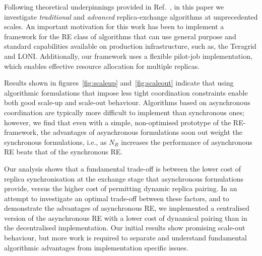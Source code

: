 \documentclass{rspublic}
\newcommand{\alnote}[1]{ {\textcolor{blue} { ***andre: #1 }}}
\newcommand{\athotanote}[1]{ {\textcolor{green} { ***athota: #1 }}}
\newcommand{\alnote}[1]{}
\newcommand{\athotanote}[1]{}
\begin{document}
Following theoretical underpinnings provided in
Ref.~\citep{parashar_arepex,DBLP:journals/jcc/GallicchioLP08}, in this
paper we investigate {\it traditional} and {\it advanced}
replica-exchange algorithms at unprecedented scales.  An important
motivation for this work has been to implement a framework for the RE
class of algorithms that can use general purpose and standard
capabilities available on production infrastructure, such as, the
Teragrid and LONI.  Additionally, our framework uses a flexible
pilot-job implementation, which enables effective resource allocation
for multiple replicas.

Results shown in figures~\ref{fig:scaleup} and~\ref{fig:scaleout}
indicate that using algorithmic formulations that impose less tight
coordination constraints enable both good scale-up and scale-out
behaviour.  Algorithms based on asynchronous coordination are
typically more difficult to implement than synchronous ones; however,
we find that even with a simple, non-optimised prototype of the
RE-framework, the advantages of asynchronous formulations soon out
weight the synchronous formulations, i.e., as $N_R$ increases the
performance of asynchronous RE beats that of the synchronous RE.  

Our analysis shows that a fundamental trade-off is between the lower
cost of replica synchronisation at the exchange stage that
asynchronous formulations provide, versus the higher cost of
permitting dynamic replica pairing.  In an attempt to investigate an
optimal trade-off between these factors, and to demonstrate the
advantages of asynchronous RE, we implemented a centralised version of
the asynchronous RE with a lower cost of dynamical pairing than in
the decentralised implementation. Our initial results show promising
scale-out behaviour, but more work is required to separate and
understand fundamental algorithmic advantages from implementation
specific issues.




\end{document}
